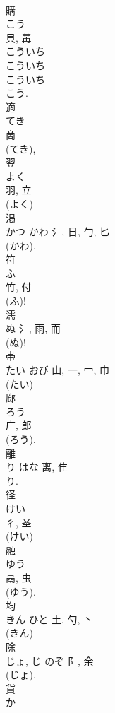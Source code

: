 \documentclass[8pt]{extreport}
\begin{document}
\begin{CJK}{UTF8}{min}
\\	購	
\\	こう	
\\	貝, 冓	
\\	こういち 
\\	こういち 
\\	こういち 
\\	こう.
\\	適	
\\	てき	
\\	啇		
\\	(てき), 
\\	翌	
\\	よく	
\\	羽, 立	
\\	(よく) 
\\	渇	
\\	かつ	かわ	氵, 日, 勹, 匕	
\\	(かわ). 
\\	符	
\\	ふ	
\\	竹, 付	
\\	(ふ)! 
\\	濡	
\\	ぬ	氵, 雨, 而	
\\	(ぬ)!	
\\	帯	
\\	たい	おび	山, 一, 冖, 巾	
\\	(たい) 
\\	廊	
\\	ろう	
\\	广, 郎	
\\	(ろう).	
\\	離	
\\	り	はな	离, 隹	
\\	り.	
\\	径	
\\	けい	
\\	彳, 圣	
\\	(けい) 
\\	融	
\\	ゆう	
\\	鬲, 虫	
\\	(ゆう). 
\\	均	
\\	きん	ひと	土, 勺, 丶	
\\	(きん) 
\\	除	
\\	じょ, じ	のぞ	阝, 余	
\\	(じょ).	
\\	貨	
\\	か	

\end{CJK}
\end{document}
